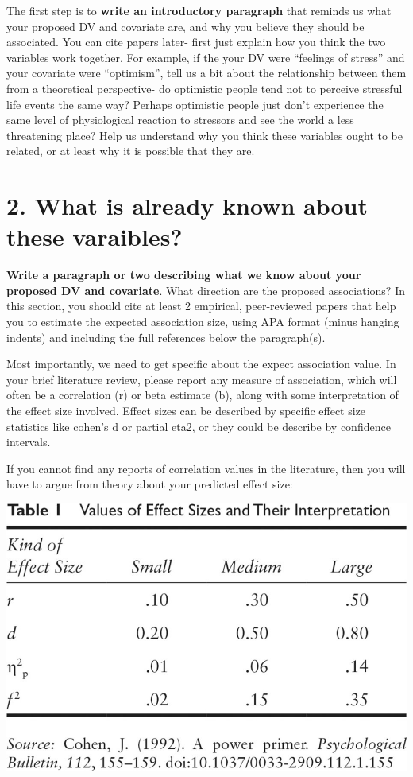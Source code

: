 \documentclass[
]{book}
\begin{document}
The first step is to \textbf{write an introductory paragraph} that reminds us what your proposed DV and covariate are, and why you believe they should be associated. You can cite papers later- first just explain how you think the two variables work together. For example, if the your DV were ``feelings of stress'' and your covariate were ``optimism'', tell us a bit about the relationship between them from a theoretical perspective- do optimistic people tend not to perceive stressful life events the same way? Perhaps optimistic people just don't experience the same level of physiological reaction to stressors and see the world a less threatening place? Help us understand why you think these variables ought to be related, or at least why it is possible that they are.

\section*{2. What is already known about these varaibles?}\label{what-is-already-known-about-these-varaibles}

\textbf{Write a paragraph or two describing what we know about your proposed DV and covariate}. What direction are the proposed associations? In this section, you should cite at least 2 empirical, peer-reviewed papers that help you to estimate the expected association size, using APA format (minus hanging indents) and including the full references below the paragraph(s).

Most importantly, we need to get specific about the expect association value. In your brief literature review, please report any measure of association, which will often be a correlation (r) or beta estimate (b), along with some interpretation of the effect size involved. Effect sizes can be described by specific effect size statistics like cohen's d or partial eta2, or they could be describe by confidence intervals.

If you cannot find any reports of correlation values in the literature, then you will have to argue from theory about your predicted effect size:

\includegraphics{Figs/effect_size.jpg}
\end{document}

